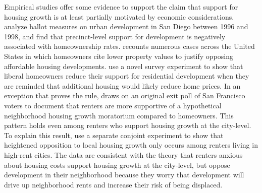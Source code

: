 \documentclass[article,12pt]{memoir}
\begin{document}
Empirical studies offer some evidence to support the claim that support for housing growth is at least partially motivated by economic considerations. \citet{gerber_development_2003} analyze ballot measures on urban development in San Diego between 1996 and 1998, and find that precinct-level support for development is negatively associated with homeownership rates. \citet[][chap. 5]{mccabe_no_2016} recounts numerous cases across the United States in which homeowners cite lower property values to justify opposing affordable housing developments. \citet{marble_where_2018} use a novel survey experiment to show that liberal homeowners reduce their support for residential development when they are reminded that additional housing would likely reduce home prices. In an exception that proves the rule, \citet{hankinson_when_2018} draws on an original exit poll of San Francisco voters to document that renters are more supportive of a hypothetical neighborhood housing growth moratorium compared to homeowners. This pattern holds even among renters who support housing growth at the city-level. To explain this result, \citeauthor{hankinson_when_2018} use a separate conjoint experiment to show that heightened opposition to local housing growth only occurs among renters living in high-rent cities. The data are consistent with the theory that renters anxious about housing costs support housing growth at the city-level, but oppose development in their neighborhood because they worry that development will drive up neighborhood rents and increase their risk of being displaced.
\end{document}
